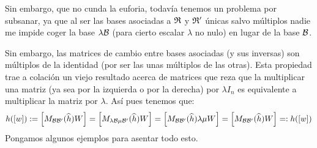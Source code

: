 Sin embargo, que no cunda la euforia, todavía tenemos un problema por subsanar, ya que al ser las bases asociadas a $\mathfrak{R}$ y $\mathfrak{R}'$ únicas salvo múltiplos nadie me impide coger la base $\lambda\mathcal{B}$ (para cierto escalar $\lambda$ no nulo) en lugar de la base $\mathcal{B}$.

Sin embargo, las matrices de cambio entre bases asociadas (y sus inversas) son múltiplos de la identidad (por ser las unas múltiplos de las otras). Esta propiedad trae a colación un viejo resultado acerca de matrices que reza que la multiplicar una matriz (ya sea por la izquierda o por la derecha) por $\lambda I_n$ es equivalente a multiplicar la matriz por $\lambda$. Así pues tenemos que:
\begin{equation}
	h(\left [ w \right ]):=\left [ M_{\mathcal{B}\mathcal{B}'}(\widehat{h})W \right ]=\left [ M_{\lambda \mathcal{B}\mu\mathcal{B}'}(\widehat{h})W \right ]=\left [ M_{\mathcal{B}\mathcal{B}'}(\widehat{h})\lambda\mu W \right ]=\left [ M_{\mathcal{B}\mathcal{B}'}(\widehat{h})W \right ]=:h(\left [ w \right ])
\end{equation}
Pongamos algunos ejemplos para asentar todo esto.
